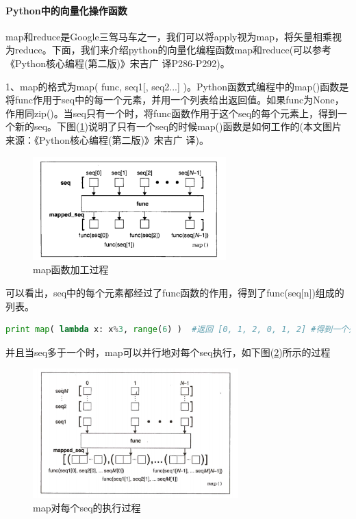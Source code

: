             \paragraph{Python中的向量化操作函数}map和reduce是Google三驾马车之一，我们可以将apply视为map，将矢量相乘视为reduce。下面，我们来介绍python的向量化编程函数map和reduce(可以参考《Python核心编程(第二版)》宋吉广 译P286-P292)。
            \par
            1、map的格式为map( func, seq1[, seq2...] )。Python函数式编程中的map()函数是将func作用于seq中的每一个元素，并用一个列表给出返回值。如果func为None，作用同zip()。当seq只有一个时，将func函数作用于这个seq的每个元素上，得到一个新的seq。下图(\ref{fig:map函数加工过程})说明了只有一个seq的时候map()函数是如何工作的(本文图片来源：《Python核心编程(第二版)》宋吉广 译)。
            \begin{figure}[H]
            \centering
            \includegraphics[height=4cm]{images/map_fuc_workprocess.jpg}
            \caption{map函数加工过程}
            \label{fig:map函数加工过程}
            \end{figure}\par
            可以看出，seq中的每个元素都经过了func函数的作用，得到了func(seq[n])组成的列表。
                \begin{lstlisting}[language=Python]
            print map( lambda x: x%3, range(6) )  #返回 [0, 1, 2, 0, 1, 2] #得到一个列表中数字%3的余数
                \end{lstlisting}\par
            并且当seq多于一个时，map可以并行地对每个seq执行，如下图(\ref{fig:map对每个seq的执行过程})所示的过程
            \begin{figure}[H]
            \centering
            \includegraphics[height=5cm]{images/map_seq_workprocess.jpg}
            \caption{map对每个seq的执行过程}
            \label{fig:map对每个seq的执行过程}
            \end{figure}\par
